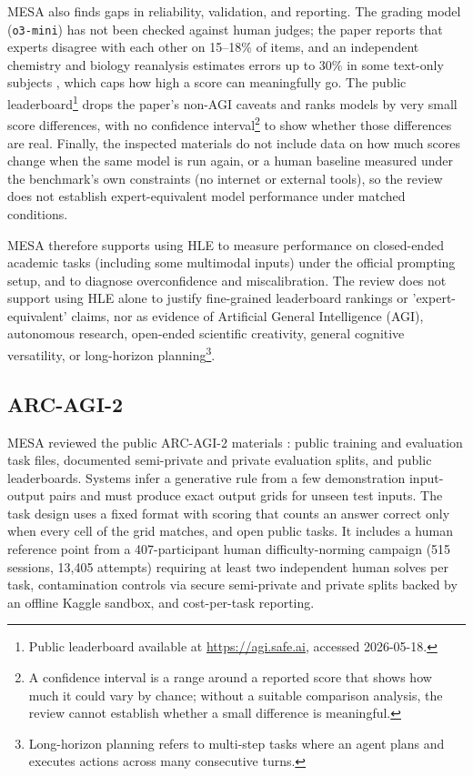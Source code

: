 \documentclass[conference]{IEEEtran}
\begin{document}
        MESA also finds gaps in reliability, validation, and reporting. The grading model (\texttt{o3-mini}) has not been checked against human judges; the paper reports that experts disagree with each other on 15--18\% of items, and an independent chemistry and biology reanalysis estimates errors up to 30\% in some text-only subjects \cite{skarlinski_futurehouse_hle_2025}, which caps how high a score can meaningfully go. The public leaderboard\footnote{Public leaderboard available at \url{https://agi.safe.ai}, accessed 2026-05-18.} drops the paper's non-AGI caveats and ranks models by very small score differences, with no confidence interval\footnote{A confidence interval is a range around a reported score that shows how much it could vary by chance; without a suitable comparison analysis, the review cannot establish whether a small difference is meaningful.} to show whether those differences are real. Finally, the inspected materials do not include data on how much scores change when the same model is run again, or a human baseline measured under the benchmark's own constraints (no internet or external tools), so the review does not establish expert-equivalent model performance under matched conditions.
        
        MESA therefore supports using HLE to measure performance on closed-ended academic tasks (including some multimodal inputs) under the official prompting setup, and to diagnose overconfidence and miscalibration. The review does not support using HLE alone to justify fine-grained leaderboard rankings or 'expert-equivalent' claims, nor as evidence of Artificial General Intelligence (AGI), autonomous research, open-ended scientific creativity, general cognitive versatility, or long-horizon planning\footnote{Long-horizon planning refers to multi-step tasks where an agent plans and executes actions across many consecutive turns.}.
    
    \subsection{ARC-AGI-2}
    
        MESA reviewed the public ARC-AGI-2 materials \cite{chollet_arc_agi_2_2025}: public training and evaluation task files, documented semi-private and private evaluation splits, and public leaderboards. Systems infer a generative rule from a few demonstration input-output pairs and must produce exact output grids for unseen test inputs. The task design uses a fixed format with scoring that counts an answer correct only when every cell of the grid matches, and open public tasks. It includes a human reference point from a 407-participant human difficulty-norming campaign (515 sessions, 13{,}405 attempts) requiring at least two independent human solves per task, contamination controls via secure semi-private and private splits backed by an offline Kaggle sandbox, and cost-per-task reporting.
\end{document}

